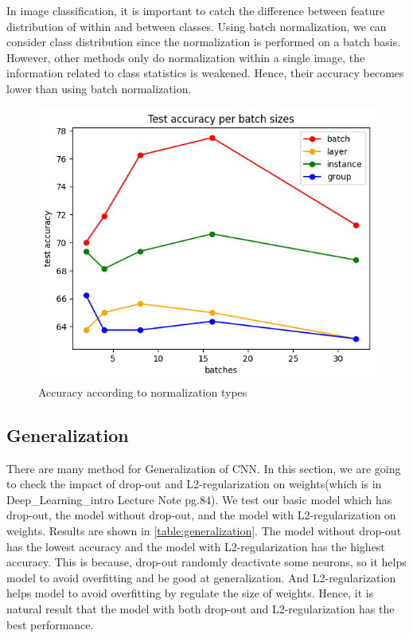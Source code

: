 In image classification, it is important to catch the difference between feature distribution of within and between classes. Using batch normalization, we can consider class distribution since the normalization is performed on a batch basis. However, other methods only do normalization within a single image, the information related to class statistics is weakened. Hence, their accuracy becomes lower than using batch normalization.

\begin{figure}
	\centering
	\includegraphics[width=0.4\linewidth]{image/q4-3.png}
	\caption{Accuracy according to normalization types}
	\label{fig:normalization}
\end{figure}

\subsection{Generalization}
There are many method for Generalization of CNN. In this section, we are going to check the impact of drop-out and L2-regularization on weights(which is in Deep\_Learning\_intro Lecture Note pg.84). We test our basic model which has drop-out, the model without drop-out, and the model with L2-regularization on weights. Results are shown in \cref{table:generalization}. The model without drop-out has the lowest accuracy and the model with L2-regularization has the highest accuracy. This is because, drop-out randomly deactivate some neurons, so it helps model to avoid overfitting and be good at generalization. And L2-regularization helps model to avoid overfitting by regulate the size of weights.
Hence, it is natural result that the model with both drop-out and L2-regularization has the best performance.

\begin{table}
	\centering
	\setlength{\tabcolsep}{6pt}
	\renewcommand{\arraystretch}{1.5}
    \caption{Impact of generalization}
	\label{table:generalization}
\end{table}
	

